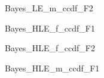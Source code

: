 \documentclass[a4j,11pt,mc]{jreport}
\begin{document}
	\begin{figure}[H]
		\begin{center}
				\caption{Bayes\_LE\_m\_ccdf\_F2}
		\end{center}
	\end{figure}




	\begin{figure}[H]
		\begin{center}
				\caption{Bayes\_HLE\_f\_ccdf\_F1}
		\end{center}
	\end{figure}



	\begin{figure}[H]
		\begin{center}
				\caption{Bayes\_HLE\_f\_ccdf\_F2}
		\end{center}
	\end{figure}



	\begin{figure}[H]
		\begin{center}
				\caption{Bayes\_HLE\_m\_ccdf\_F1}
		\end{center}
	\end{figure}
\end{document}
